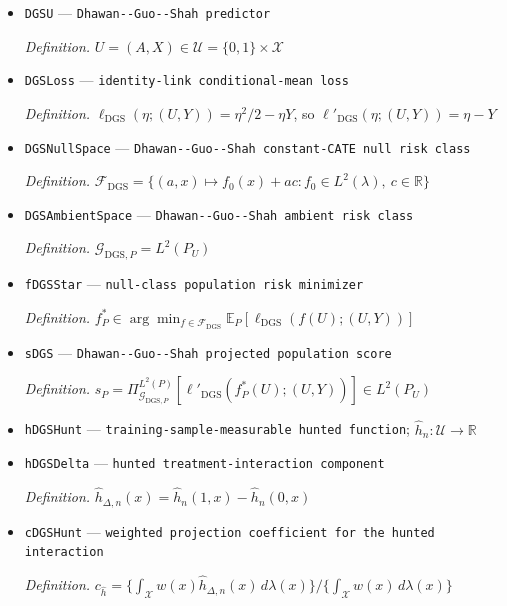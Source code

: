 \documentclass{article}
\begin{document}
\begin{itemize}
  \item \texttt{DGSU} --- \texttt{Dhawan-\allowbreak{}-\allowbreak{}Guo-\allowbreak{}-\allowbreak{}Shah predictor}
  \par\smallskip\noindent\emph{Definition.} \(U=(A,X)\in\mathcal U=\{0,1\}\times\mathcal X\)
  \item \texttt{DGSLoss} --- \texttt{identity-\allowbreak{}link conditional-\allowbreak{}mean loss}
  \par\smallskip\noindent\emph{Definition.} \(\ell_{\mathrm{DGS}}(\eta;(U,Y))=\eta^2/2-\eta Y\), so \(\ell'_{\mathrm{DGS}}(\eta;(U,Y))=\eta-Y\)
  \item \texttt{DGSNullSpace} --- \texttt{Dhawan-\allowbreak{}-\allowbreak{}Guo-\allowbreak{}-\allowbreak{}Shah constant-\allowbreak{}CATE null risk class}
  \par\smallskip\noindent\emph{Definition.} \(\mathcal F_{\mathrm{DGS}}=\{(a,x)\mapsto f_0(x)+ac:f_0\in L^2(\lambda),\ c\in\mathbb R\}\)
  \item \texttt{DGSAmbientSpace} --- \texttt{Dhawan-\allowbreak{}-\allowbreak{}Guo-\allowbreak{}-\allowbreak{}Shah ambient risk class}
  \par\smallskip\noindent\emph{Definition.} \(\mathcal G_{\mathrm{DGS},P}=L^2(P_U)\)
  \item \texttt{fDGSStar} --- \texttt{null-\allowbreak{}class population risk minimizer}
  \par\smallskip\noindent\emph{Definition.} \(f_P^*\in\arg\min_{f\in\mathcal F_{\mathrm{DGS}}}\mathbb E_P[\ell_{\mathrm{DGS}}(f(U);(U,Y))]\)
  \item \texttt{sDGS} --- \texttt{Dhawan-\allowbreak{}-\allowbreak{}Guo-\allowbreak{}-\allowbreak{}Shah projected population score}
  \par\smallskip\noindent\emph{Definition.} \(s_P=\Pi_{\mathcal G_{\mathrm{DGS},P}}^{L^2(P)}[\ell'_{\mathrm{DGS}}(f_P^*(U);(U,Y))]\in L^2(P_U)\)
  \item \texttt{hDGSHunt} --- \texttt{training-\allowbreak{}sample-\allowbreak{}measurable hunted function}; \(\widehat h_n:\mathcal U\to\mathbb R\)
  \item \texttt{hDGSDelta} --- \texttt{hunted treatment-\allowbreak{}interaction component}
  \par\smallskip\noindent\emph{Definition.} \(\widehat h_{\Delta,n}(x)=\widehat h_n(1,x)-\widehat h_n(0,x)\)
  \item \texttt{cDGSHunt} --- \texttt{weighted projection coefficient for the hunted interaction}
  \par\smallskip\noindent\emph{Definition.} \(c_{\widehat h}=\{\int_{\mathcal X}w(x)\widehat h_{\Delta,n}(x)\,d\lambda(x)\}/\{\int_{\mathcal X}w(x)\,d\lambda(x)\}\)

\end{itemize}
\end{document}
